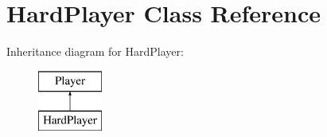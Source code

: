 \hypertarget{class_hard_player}{}\section{Hard\+Player Class Reference}
\label{class_hard_player}
Inheritance diagram for Hard\+Player\+:\begin{figure}[H]
\begin{center}
\leavevmode
\includegraphics[height=2.000000cm]{class_hard_player}
\end{center}
\end{figure}
